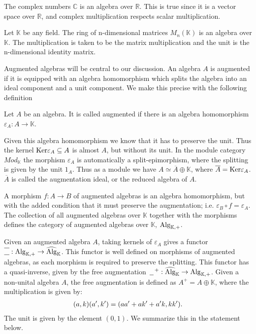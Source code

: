 \documentclass[../thesis.tex]{subfiles}
\begin{document}
            \begin{example}
                The complex numbers $\mathbb{C}$ is an algebra over $\mathbb{R}$. This is true since it is a vector space over $\mathbb{R}$, and complex multiplication respects scalar multiplication.
            \end{example}

            \begin{example}
                Let $\mathbb{K}$ be any field. The ring of n-dimensional matrices $M_n(\mathbb{K})$ is an algebra over $\mathbb{K}$. The multiplication is taken to be the matrix multiplication and the unit is the n-dimensional identity matrix.
            \end{example}

            Augmented algebras will be central to our discussion. An algebra $A$ is augmented if it is equipped with an algebra homomorphism which splits the algebra into an ideal component and a unit component. We make this precise with the following definition

            \begin{definition}
                Let $A$ be an algebra. It is called augmented if there is an algebra homomorphism $\varepsilon_A : A \rightarrow \mathbb{K}$.
            \end{definition}

            Given this algebra homomorphism we know that it has to preserve the unit. Thus the kernel $\tt{Ker}\varepsilon_A \subseteq A$ is almost $A$, but without its unit. In the module category $Mod_\mathbb{K}$ the morphism $\varepsilon_A$ is automatically a split-epimorphism, where the splitting is given by the unit $1_A$. Thus as a module we have $A \simeq \overline{A}\oplus\mathbb{K}$, where $\overline{A} = \tt{Ker}\varepsilon_A$. $\overline{A}$ is called the augmentation ideal, or the reduced algebra of $A$.

            A morphism $f : A \rightarrow B$ of augmented algebras is an algebra homomorphism, but with the added condition that it must preserve the augmentation; i.e. $\varepsilon_B \circ f = \varepsilon_A$. The collection of all augmented algebras over $\mathbb{K}$ together with the morphisms defines the category of augmented algebras over $\mathbb{K}$, $\tt{Alg}_{\mathbb{K},+}$.

            Given an augmented algebra $A$, taking kernels of $\varepsilon_A$ gives a functor $\overline{\underline{\phantom{A}}} : \tt{Alg}_{\mathbb{K},+} \rightarrow \widehat{\tt{Alg}}_\mathbb{K}$. This functor is well defined on morphisms of augmented algebras, as each morphism is required to preserve the splitting. This functor has a quasi-inverse, given by the free augmentation $\argument^+ : \widehat{\tt{Alg}}_\mathbb{K} \rightarrow \tt{Alg}_{\mathbb{K},+}$. Given a non-unital algebra $A$, the free augmentation is defined as $A^+ = A\oplus\mathbb{K}$, where the multiplication is given by:
            \begin{align*}
                (a,k)(a',k') = (aa' + ak' + a'k, kk')\tt{.}
            \end{align*}
            The unit is given by the element $(0,1)$. We summarize this in the statement below.
            
\end{document}
